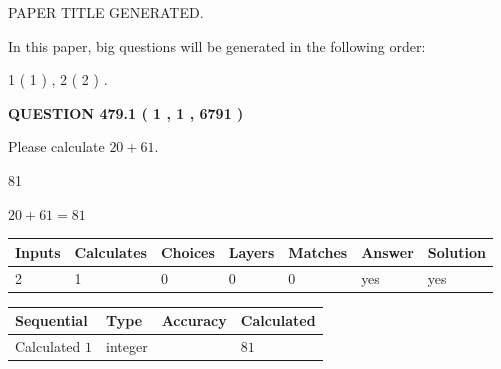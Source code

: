 \documentclass[12pt]{article}
\begin{document}
 
 
 
   
   
 PAPER TITLE GENERATED.
   
   
   
\vspace{0.2in}
   
In this paper, big questions will be generated in the following order: 
   
   
   1 ( 1 )
 ,
   2 ( 2 )
 .
  
\vspace{0.2in}
  
{\textbf{\Large{QUESTION
479.1 
 ( 1 , 1 , 6791 )
}}}
  
  
 
Please calculate $ %
20 +  %
61 $.
 
 
 
\noindent{}
 
 

81
 
 
\noindent{}
 
 

 
 
 
\noindent{}
 
 

$ %
20 +  %
61=   %
81$
 
 
\noindent{}
 
 

 
   
   
   
   
\noindent\begin{tabular}{|l|l|l|l|l|l|l|}
 \hline
Inputs & Calculates & Choices & Layers & Matches & Answer & Solution \\ \hline
 2  & 
 1  & 
 0
  & 
 0  & 
 0  & 
  yes & 
  yes 
  \\ \hline
 \end{tabular}
   
   
   
   
\noindent{}
   
   
  
  
\noindent\begin{tabular}{|l|l|l|l|}
\hline
 Sequential & Type & Accuracy & Calculated \\ 
\hline
 
 
  Calculated $  1 $ & integer &  & 
  $ 81 $ 
 \\  \hline  
 \end{tabular}
   
\end{document}
